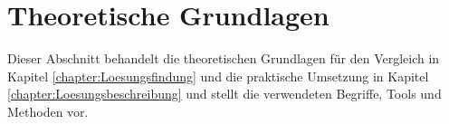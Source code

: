 \chapter{Theoretische Grundlagen}
\label{chapter:TheoretischeGrundlagen}
Dieser Abschnitt behandelt die theoretischen Grundlagen für den Vergleich in Kapitel \ref{chapter:Loesungsfindung} und die praktische Umsetzung in Kapitel \ref{chapter:Loesungsbeschreibung} und stellt die verwendeten Begriffe, Tools und Methoden vor.

\blindtext
